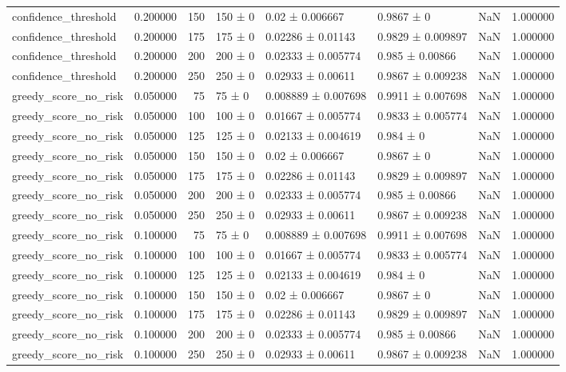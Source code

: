 \begin{tabular}{lrrllllr}
confidence_threshold & 0.200000 & 150 & 150 ± 0 & 0.02 ± 0.006667 & 0.9867 ± 0 & NaN & 1.000000 \\
confidence_threshold & 0.200000 & 175 & 175 ± 0 & 0.02286 ± 0.01143 & 0.9829 ± 0.009897 & NaN & 1.000000 \\
confidence_threshold & 0.200000 & 200 & 200 ± 0 & 0.02333 ± 0.005774 & 0.985 ± 0.00866 & NaN & 1.000000 \\
confidence_threshold & 0.200000 & 250 & 250 ± 0 & 0.02933 ± 0.00611 & 0.9867 ± 0.009238 & NaN & 1.000000 \\
greedy_score_no_risk & 0.050000 & 75 & 75 ± 0 & 0.008889 ± 0.007698 & 0.9911 ± 0.007698 & NaN & 1.000000 \\
greedy_score_no_risk & 0.050000 & 100 & 100 ± 0 & 0.01667 ± 0.005774 & 0.9833 ± 0.005774 & NaN & 1.000000 \\
greedy_score_no_risk & 0.050000 & 125 & 125 ± 0 & 0.02133 ± 0.004619 & 0.984 ± 0 & NaN & 1.000000 \\
greedy_score_no_risk & 0.050000 & 150 & 150 ± 0 & 0.02 ± 0.006667 & 0.9867 ± 0 & NaN & 1.000000 \\
greedy_score_no_risk & 0.050000 & 175 & 175 ± 0 & 0.02286 ± 0.01143 & 0.9829 ± 0.009897 & NaN & 1.000000 \\
greedy_score_no_risk & 0.050000 & 200 & 200 ± 0 & 0.02333 ± 0.005774 & 0.985 ± 0.00866 & NaN & 1.000000 \\
greedy_score_no_risk & 0.050000 & 250 & 250 ± 0 & 0.02933 ± 0.00611 & 0.9867 ± 0.009238 & NaN & 1.000000 \\
greedy_score_no_risk & 0.100000 & 75 & 75 ± 0 & 0.008889 ± 0.007698 & 0.9911 ± 0.007698 & NaN & 1.000000 \\
greedy_score_no_risk & 0.100000 & 100 & 100 ± 0 & 0.01667 ± 0.005774 & 0.9833 ± 0.005774 & NaN & 1.000000 \\
greedy_score_no_risk & 0.100000 & 125 & 125 ± 0 & 0.02133 ± 0.004619 & 0.984 ± 0 & NaN & 1.000000 \\
greedy_score_no_risk & 0.100000 & 150 & 150 ± 0 & 0.02 ± 0.006667 & 0.9867 ± 0 & NaN & 1.000000 \\
greedy_score_no_risk & 0.100000 & 175 & 175 ± 0 & 0.02286 ± 0.01143 & 0.9829 ± 0.009897 & NaN & 1.000000 \\
greedy_score_no_risk & 0.100000 & 200 & 200 ± 0 & 0.02333 ± 0.005774 & 0.985 ± 0.00866 & NaN & 1.000000 \\
greedy_score_no_risk & 0.100000 & 250 & 250 ± 0 & 0.02933 ± 0.00611 & 0.9867 ± 0.009238 & NaN & 1.000000 \\

\end{tabular}
